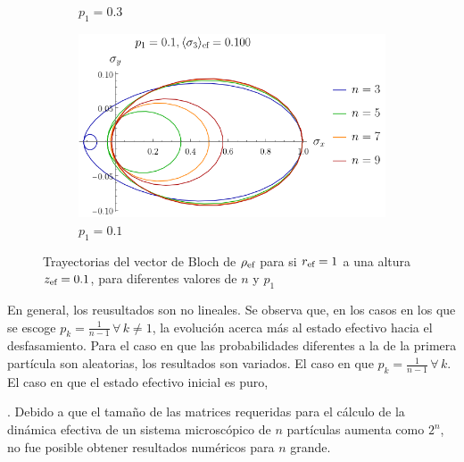 \begin{figure}
\begin{subfigure}[b]{0.475\textwidth}
        \caption{$p_{1}=0.3$}   
        \label{fig:OpenIsingPure3}
    \end{subfigure}
    \hfill
    \begin{subfigure}[b]{0.475\textwidth}   
        \centering 
        \includegraphics[width=\textwidth]{chapter3/figures_special/Ising_open_preferential_equal_p_n=n_r=1._z=0.10_p1=0.1.png}
        \caption{$p_{1}=0.1$}    
        \label{fig:OpenIsingPure4}
    \end{subfigure}
    \caption{Trayectorias del vector de Bloch de $\rho_{\text{ef}}$ para si $r_{\text{ef}}=1$ a una altura $z_{\text{ef}}=0.1$, para diferentes valores de $n$ y $p_{1}$}
    \label{fig:OpenIsingPure}
\end{figure}

En general, los reusultados son no lineales. Se observa que, en los casos en los que se escoge $p_{k}=\frac{1}{n-1}\,\forall\,k\neq 1$, la evolución acerca más al estado efectivo hacia el desfasamiento. Para el caso en que las probabilidades diferentes a la de la primera partícula son aleatorias, los resultados son variados. El caso en que $p_{k}=\frac{1}{n-1}\,\forall\,k$. El caso en que el estado efectivo inicial es puro,

. Debido a que el tamaño de las matrices requeridas para el cálculo de la dinámica efectiva de un sistema microscópico de $n$ partículas aumenta como $2^{n}$, no fue posible obtener resultados numéricos para $n$ grande.


